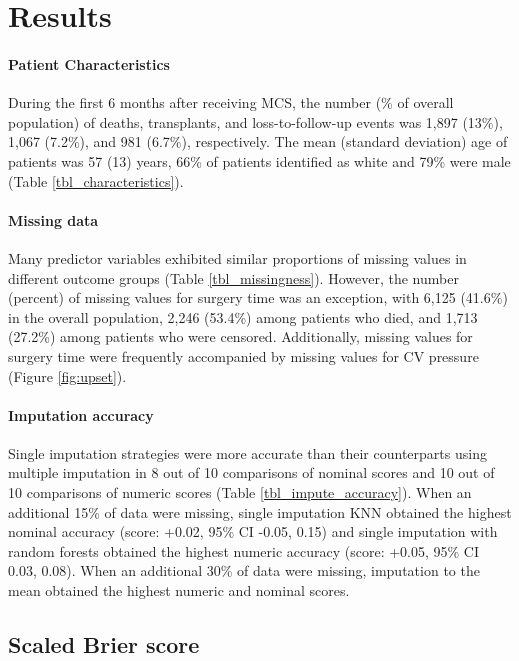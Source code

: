 \documentclass{article}
\begin{document}
\hypertarget{results}{%
\section{Results}\label{results}}

\paragraph{Patient Characteristics}

During the first 6 months after receiving MCS, the number (\% of overall
population) of deaths, transplants, and loss-to-follow-up events was
1,897 (13\%), 1,067 (7.2\%), and 981 (6.7\%), respectively. The mean
(standard deviation) age of patients was 57 (13) years, 66\% of patients
identified as white and 79\% were male (Table
\ref{tbl_characteristics}).

\paragraph{Missing data}

Many predictor variables exhibited similar proportions of missing values
in different outcome groups (Table \ref{tbl_missingness}). However, the
number (percent) of missing values for surgery time was an exception,
with 6,125 (41.6\%) in the overall population, 2,246 (53.4\%) among
patients who died, and 1,713 (27.2\%) among patients who were censored.
Additionally, missing values for surgery time were frequently
accompanied by missing values for CV pressure (Figure \ref{fig:upset}).

\paragraph{Imputation accuracy}

Single imputation strategies were more accurate than their counterparts
using multiple imputation in 8 out of 10 comparisons of nominal scores
and 10 out of 10 comparisons of numeric scores (Table
\ref{tbl_impute_accuracy}). When an additional 15\% of data were
missing, single imputation KNN obtained the highest nominal accuracy
(score: +0.02, 95\% CI -0.05, 0.15) and single imputation with random
forests obtained the highest numeric accuracy (score: +0.05, 95\% CI
0.03, 0.08). When an additional 30\% of data were missing, imputation to
the mean obtained the highest numeric and nominal scores.

\hypertarget{scaled-brier-score}{%
\subsection{Scaled Brier score}\label{scaled-brier-score}}
\end{document}
